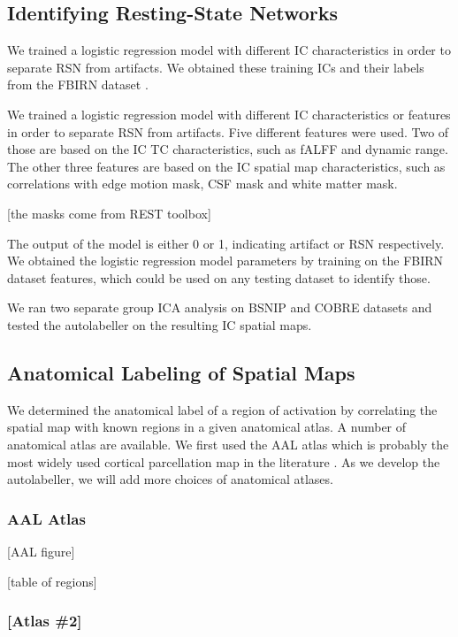\documentclass{article}
\begin{document}
\subsection{Identifying Resting-State Networks}

We trained a logistic regression model with different \ac{IC} characteristics in order to separate \ac{RSN} from artifacts.
We obtained these training \acp{IC} and their labels from the \ac{FBIRN} dataset \citep{b1}.

We trained a logistic regression model with different \ac{IC} characteristics or features in order to separate \ac{RSN} from artifacts.
Five different features were used.
Two of those are based on the \ac{IC} \ac{TC} characteristics, such as \ac{fALFF} and dynamic range.
The other three features are based on the \ac{IC} spatial map characteristics, such as correlations with edge motion mask, \ac{CSF} mask and white matter mask.

[the masks come from REST toolbox]

The output of the model is either 0 or 1, indicating artifact or \ac{RSN} respectively.
We obtained the logistic regression model parameters by training on the \ac{FBIRN} dataset features, which could be used on any testing dataset to identify those.

We ran two separate group \ac{ICA} analysis on \ac{BSNIP} and \ac{COBRE} datasets and tested the autolabeller on the resulting \ac{IC} spatial maps.

\subsection{Anatomical Labeling of Spatial Maps}

We determined the anatomical label of a region of activation by correlating the spatial map with known regions in a given anatomical atlas.
A number of anatomical atlas are available.
We first used the \ac{AAL} atlas which is probably the most widely used cortical parcellation map in the literature \citep{b2}.
As we develop the autolabeller, we will add more choices of anatomical atlases.

\subsubsection{AAL Atlas}

[AAL figure]

[table of regions]

\subsubsection{[Atlas \#2]}
\end{document}

